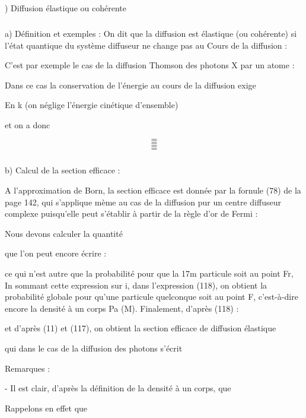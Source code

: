 \subsection{}%
) Diffusion élastique ou cohérente

\subsubsection{}%
a) Définition et exemples :
On dit que la diffusion est élastique (ou cohérente) si l'état quantique du système
diffuseur ne change pas au Cours de la diffusion :

C'est par exemple le cas de la diffusion Thomson des photons X par un atome :

Dans ce cas la conservation de l'énergie au cours de la diffusion exige

 En k (on néglige l'énergie cinétique d'ensemble)

et on a donc

%
\[
\tag{117}=
\]
\[
\tag{118}=
\]
\[
\tag{119}=
\]
\[
\tag{120}=
\]

\subsubsection{}%
b) Calcul de la section efficace :

A l'approximation de Born, la section efficace est donnée par
la fornule (78) de la page 142, qui s'applique mème au cas de la diffusion
pur un centre diffuseur complexe puisqu'elle peut s'établir à partir de la
règle d'or de Fermi :

Nous devons calculer la quantité

que l'on peut encore écrire :

ce qui n'est autre que la probabilité pour que la 17m particule soit au point
Fr, In sommant cette expression sur i, dans l'expression (118), on obtient la
probabilité globale pour qu'une particule quelconque soit au point F, c'est-à-dire
encore la densité à un corps Pa (M). Finalement, d'après (118) :

et d'après (11) et (117), on obtient la section efficace de diffusion élastique

qui dans le cas de la diffusion des photons s'écrit


Remarques :

- Il est clair, d'après la définition de la densité à un corps, que

 Rappelons en effet que

